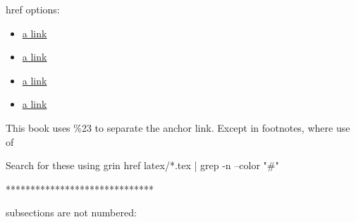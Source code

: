 
href options:
\begin{itemize}
    \item \href{https://en.wikipedia.org/wiki/Business_process%23Adam_Smith}{a link}
    \item \href{https://en.wikipedia.org/wiki/Business_process\%23Adam_Smith}{a link}
    \item \href{https://en.wikipedia.org/wiki/Business_process#Adam_Smith}{a link}
    \item \href{https://en.wikipedia.org/wiki/Business_process\#Adam_Smith}{a link}
\end{itemize}
This book uses \%23 to separate the anchor link. 
Except in footnotes, where use of %

Search for these using
grin href latex/*.tex | grep -n --color "#"

******************************

subsections are not numbered: \subsection*{}
